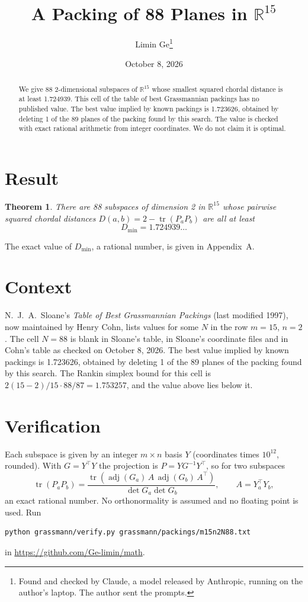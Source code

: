 \documentclass[11pt,a4paper]{article}
\title{A Packing of 88 Planes in $\mathbb{R}^{15}$}
\author{Limin Ge\thanks{Found and checked by Claude, a model released by Anthropic, running on the author's laptop. The author sent the prompts.}}
\date{October 8, 2026}
\newtheorem*{theorem}{Theorem}
\begin{document}
\maketitle
\begin{abstract}
We give 88 2-dimensional subspaces of $\mathbb{R}^{15}$ whose smallest squared chordal distance is at least 1.724939. This cell of the table of best Grassmannian packings has no published value. The best value implied by known packings is 1.723626, obtained by deleting 1 of the 89 planes of the packing found by this search. The value is checked with exact rational arithmetic from integer coordinates. We do not claim it is optimal.
\end{abstract}

\section{Result}
\begin{theorem}
There are 88 subspaces of dimension 2 in $\mathbb{R}^{15}$ whose pairwise squared chordal distances $D(a,b) = 2 - \operatorname{tr}(P_aP_b)$ are all at least
\[ D_{\min} = 1.724939\ldots \]
\end{theorem}
The exact value of $D_{\min}$, a rational number, is given in Appendix~A.


\section{Context}
N.~J.~A.~Sloane's \emph{Table of Best Grassmannian Packings} (last modified 1997), now maintained by Henry Cohn, lists values for some $N$ in the row $m=15$, $n=2$. The cell $N=88$ is blank in Sloane's table, in Sloane's coordinate files and in Cohn's table as checked on October 8, 2026. The best value implied by known packings is 1.723626, obtained by deleting 1 of the 89 planes of the packing found by this search. The Rankin simplex bound for this cell is $2(15-2)/15\cdot 88/87 = 1.753257$, and the value above lies below it.


\section{Verification}
Each subspace is given by an integer $m\times n$ basis $Y$ (coordinates times $10^{12}$, rounded). With $G=Y^\top Y$ the projection is $P=YG^{-1}Y^\top$, so for two subspaces
\[ \operatorname{tr}(P_aP_b)=\frac{\operatorname{tr}(\operatorname{adj}(G_a)\,A\,\operatorname{adj}(G_b)\,A^\top)}{\det G_a\det G_b},\qquad A=Y_a^\top Y_b, \]
an exact rational number. No orthonormality is assumed and no floating point is used. Run
\begin{verbatim}
python grassmann/verify.py grassmann/packings/m15n2N88.txt
\end{verbatim}
in \url{https://github.com/Ge-limin/math}.
\end{document}
